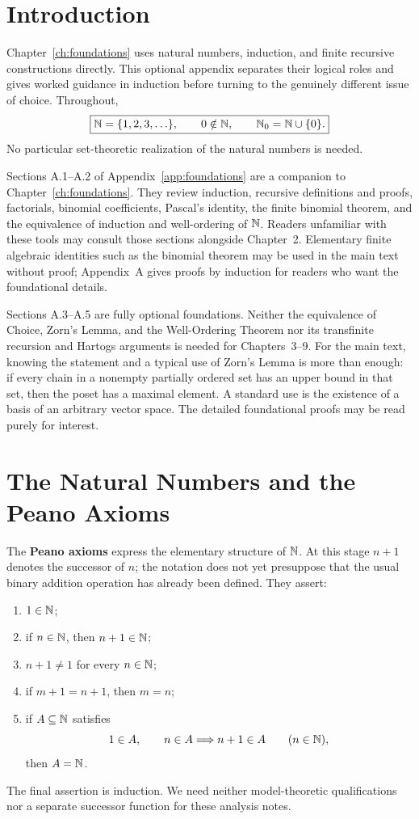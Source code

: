 \label{app:foundations}
\section*{Introduction}
Chapter~\ref{ch:foundations} uses natural numbers, induction, and finite
recursive constructions directly. This optional appendix separates their
logical roles and gives worked guidance in induction before turning to
the genuinely different issue of choice. Throughout,
\[
\boxed{\mathbb{N}=\{1,2,3,\ldots\},\qquad 0\notin\mathbb{N},\qquad \mathbb{N}_0=\mathbb{N}\cup\{0\}.}
\]
No particular set-theoretic realization of the natural numbers is needed.

Sections A.1--A.2 of Appendix~\ref{app:foundations} are a companion to
Chapter~\ref{ch:foundations}. They review induction, recursive definitions
and proofs, factorials, binomial coefficients, Pascal's identity, the finite
binomial theorem, and the equivalence of induction and well-ordering of $\mathbb{N}$.
Readers unfamiliar with these tools may consult those sections alongside
Chapter~2. Elementary finite algebraic identities such as the binomial
theorem may be used in the main text without proof; Appendix~A gives proofs
by induction for readers who want the foundational details.

Sections A.3--A.5 are fully optional foundations. Neither the equivalence
of Choice, Zorn's Lemma, and the Well-Ordering Theorem nor its transfinite
recursion and Hartogs arguments is needed for Chapters~3--9. For the main
text, knowing the statement and a typical use of Zorn's Lemma is more than
enough: if every chain in a nonempty partially ordered set has an upper
bound in that set, then the poset has a maximal element. A standard use is
the existence of a basis of an arbitrary vector space. The detailed
foundational proofs may be read purely for interest.


\section{The Natural Numbers and the Peano Axioms}
The \textbf{Peano axioms} express the elementary structure of \(\mathbb{N}\). At
this stage \(n+1\) denotes the successor of \(n\); the notation does not yet
presuppose that the usual binary addition operation has already been defined.
They assert:
\begin{enumerate}
\item \(1\in\mathbb{N}\);
\item if \(n\in\mathbb{N}\), then \(n+1\in\mathbb{N}\);
\item \(n+1\ne1\) for every \(n\in\mathbb{N}\);
\item if \(m+1=n+1\), then \(m=n\);
\item if \(A\subseteq\mathbb{N}\) satisfies
\[
1\in A,\qquad n\in A\Longrightarrow n+1\in A\qquad(n\in\mathbb{N}),
\]
then \(A=\mathbb{N}\).
\end{enumerate}
The final assertion is induction. We need neither model-theoretic
qualifications nor a separate successor function for these analysis notes.

